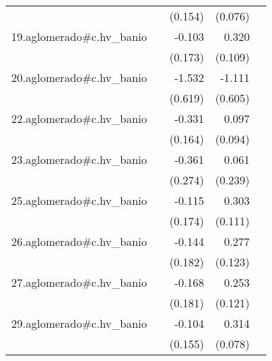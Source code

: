 {\begin{longtable}{l*{4}{D{.}{.}{-1}}}
            &                     &     (0.154)         &     (0.076)         &                     \\
\addlinespace
19.aglomerado#c.hv\_banio&                     &      -0.103         &       0.320\sym{**} &                     \\
            &                     &     (0.173)         &     (0.109)         &                     \\
\addlinespace
20.aglomerado#c.hv\_banio&                     &      -1.532\sym{*}  &      -1.111         &                     \\
            &                     &     (0.619)         &     (0.605)         &                     \\
\addlinespace
22.aglomerado#c.hv\_banio&                     &      -0.331\sym{*}  &       0.097         &                     \\
            &                     &     (0.164)         &     (0.094)         &                     \\
\addlinespace
23.aglomerado#c.hv\_banio&                     &      -0.361         &       0.061         &                     \\
            &                     &     (0.274)         &     (0.239)         &                     \\
\addlinespace
25.aglomerado#c.hv\_banio&                     &      -0.115         &       0.303\sym{**} &                     \\
            &                     &     (0.174)         &     (0.111)         &                     \\
\addlinespace
26.aglomerado#c.hv\_banio&                     &      -0.144         &       0.277\sym{*}  &                     \\
            &                     &     (0.182)         &     (0.123)         &                     \\
\addlinespace
27.aglomerado#c.hv\_banio&                     &      -0.168         &       0.253\sym{*}  &                     \\
            &                     &     (0.181)         &     (0.121)         &                     \\
\addlinespace
29.aglomerado#c.hv\_banio&                     &      -0.104         &       0.314\sym{***}&                     \\
            &                     &     (0.155)         &     (0.078)         &                     \\

\end{longtable}}

